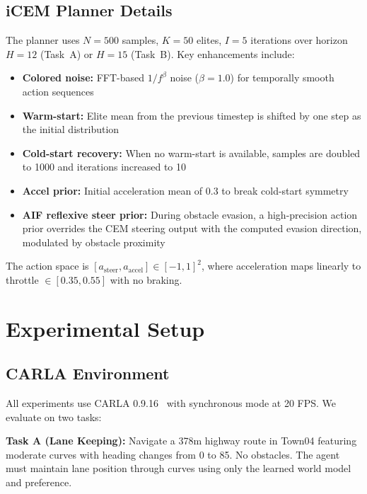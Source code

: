 \documentclass[conference]{IEEEtran}
\begin{document}
\subsection{iCEM Planner Details}

The planner uses $N{=}500$ samples, $K{=}50$ elites, $I{=}5$ iterations over horizon $H{=}12$ (Task~A) or $H{=}15$ (Task~B). Key enhancements include:
\begin{itemize}
    \item \textbf{Colored noise:} FFT-based $1/f^\beta$ noise ($\beta{=}1.0$) for temporally smooth action sequences
    \item \textbf{Warm-start:} Elite mean from the previous timestep is shifted by one step as the initial distribution
    \item \textbf{Cold-start recovery:} When no warm-start is available, samples are doubled to 1000 and iterations increased to 10
    \item \textbf{Accel prior:} Initial acceleration mean of 0.3 to break cold-start symmetry
    \item \textbf{AIF reflexive steer prior:} During obstacle evasion, a high-precision action prior overrides the CEM steering output with the computed evasion direction, modulated by obstacle proximity
\end{itemize}

The action space is $[a_{\text{steer}}, a_{\text{accel}}] \in [-1, 1]^2$, where acceleration maps linearly to throttle $\in [0.35, 0.55]$ with no braking.

\section{Experimental Setup}
\label{sec:experiments}

\subsection{CARLA Environment}

All experiments use CARLA 0.9.16~\cite{dosovitskiy2017carla} with synchronous mode at 20 FPS. We evaluate on two tasks:

\textbf{Task A (Lane Keeping):} Navigate a 378m highway route in Town04 featuring moderate curves with heading changes from 0\degree{} to 85\degree{}. No obstacles. The agent must maintain lane position through curves using only the learned world model and preference.
\end{document}
